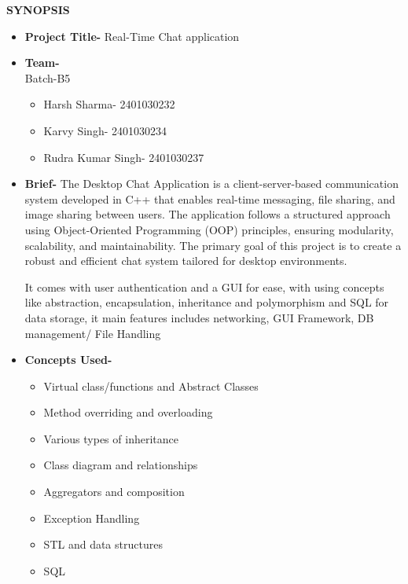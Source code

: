 \documentclass[12pt,a4paper]{article}
\begin{document}
\begin{center}
 {\LARGE \textbf{SYNOPSIS}}
\end{center}

\begin{itemize}
  \item \textbf{Project Title-} Real-Time Chat application
  \item \textbf{Team-}
    \\Batch-B5
    \begin{itemize}
      \item Harsh Sharma- 2401030232
      \item Karvy Singh- 2401030234
      \item Rudra Kumar Singh- 2401030237
    \end{itemize}
  \item \textbf{Brief-}
    The Desktop Chat Application is a client-server-based communication system developed in C++ that enables real-time messaging, file sharing, and image sharing between users. The application follows a structured approach using Object-Oriented Programming (OOP) principles, ensuring modularity, scalability, and maintainability. The primary goal of this project is to create a robust and efficient chat system tailored for desktop environments. 

  It comes with user authentication and a GUI for ease, with using concepts like abstraction, encapsulation, inheritance and polymorphism and SQL for data storage, it main features includes networking, GUI Framework, DB management/ File Handling
\item \textbf{Concepts Used-}
  \begin{itemize}
    \item Virtual class/functions and Abstract Classes
    \item Method overriding and overloading   
    \item Various types of inheritance
    \item Class diagram and relationships
    \item Aggregators and composition
    \item Exception Handling
    \item STL and data structures 
    \item SQL
  \end{itemize}

\end{itemize}
\end{document}
